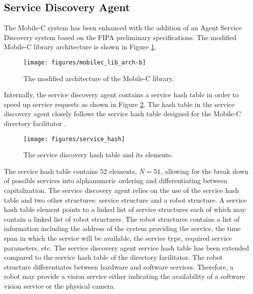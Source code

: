     \subsection{Service Discovery Agent}
      The Mobile-C system has been enhanced with the addition of an Agent 
        Service Discovery system based on the FIPA preliminary specifications.
      The modified Mobile-C library architecture is shown in Figure 
        \ref{fig:mobilec_lib_arch_new}.
      \begin{figure}%
      \centerline{\texttt{[image: figures/mobilec\_lib\_arch-b]}}
      \caption{The modified architecture of the Mobile-C library.}
      \label{fig:mobilec_lib_arch_new}
      \end{figure}

      Internally, the service discovery agent contains a service hash table in 
        order to speed up service requests as shown in Figure \ref{fig:sdahash}.
      The hash table in the service discovery agent closely follows the service
        hash table designed for the Mobile-C directory facilitator \cite{Chen2005}.
      \begin{figure}%
      \centerline{\texttt{[image: figures/service\_hash]}}
      \caption{The service discovery hash table and its elements.}
      \label{fig:sdahash}
      \end{figure}
      The service hash table contains 52 elements, $N=51$, allowing for the break 
        down of possible services into alphanumeric ordering and differentiating 
        between capitalization.
      The service discovery agent relies on the use of the service hash table and
        two other structures: service structure and a robot structure.
      A service hash table element points to a linked list of service structures 
        each of which may contain a linked list of robot structures.
      The robot structures contains a list of information including the address of
        the system providing the service, the time span in which the service will
        be available, the service type, required service parameters, etc.
      The service discovery agent service hash table has been extended compared 
        to the service hash table of the directory facilitator.
      The robot structure differentiates between hardware and software services.
      Therefore, a robot may provide a vision service either indicating the 
        availability of a software vision service or the physical camera.

